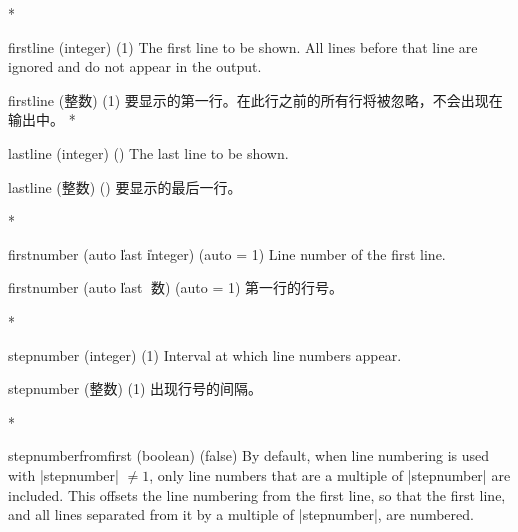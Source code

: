 \begin{optionlist}
\begin{paracol}{2}
\switchcolumn[0]*%
\item[firstline (integer) (1)]
The first line to be shown.
All lines before that line are ignored and do not appear in the output.
\switchcolumn
\item[firstline (整数) (1)]
要显示的第一行。在此行之前的所有行将被忽略，不会出现在输出中。
\switchcolumn[0]*%
\item[lastline (integer) (\meta{last line of input})]
The last line to be shown.
\switchcolumn
\item[lastline (整数) (\meta{输入的最后一行})]
要显示的最后一行。

\switchcolumn[0]*%
\item[firstnumber (auto \| last \| integer) (auto = 1)]
Line number of the first line.
\switchcolumn
\item[firstnumber (auto \| last \| 整数) (auto = 1)]
第一行的行号。

\switchcolumn[0]*%
\item[stepnumber (integer) (1)]
  Interval at which line numbers appear.
  \switchcolumn
  \item[stepnumber (整数) (1)]
  出现行号的间隔。

  \switchcolumn[0]*%

\item[stepnumberfromfirst (boolean) (false)]
By default, when line numbering is used with |stepnumber| $\ne 1$, only line numbers that are a multiple of |stepnumber| are included.  This offsets the line numbering from the first line, so that the first line, and all lines separated from it by a multiple of |stepnumber|, are numbered.


\end{paracol}
\end{optionlist}
